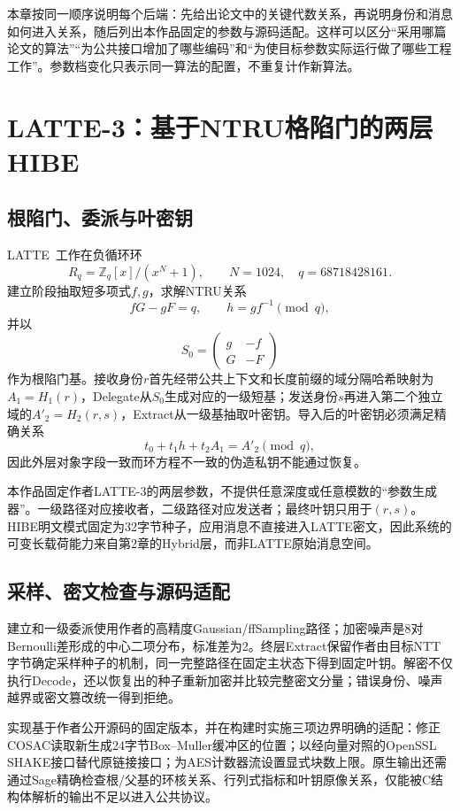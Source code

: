 \documentclass[UTF8,a4paper,12pt,oneside,openany,fontset=fandol]{ctexrep}
\begin{document}
本章按同一顺序说明每个后端：先给出论文中的关键代数关系，再说明身份和消息如何进入关系，随后列出本作品固定的参数与源码适配。这样可以区分“采用哪篇论文的算法”“为公共接口增加了哪些编码”和“为使目标参数实际运行做了哪些工程工作”。参数档变化只表示同一算法的配置，不重复计作新算法。

\section{LATTE-3：基于NTRU格陷门的两层HIBE}
\subsection{根陷门、委派与叶密钥}
LATTE~\cite{zhao2024latte}工作在负循环环
\[
  R_q=\mathbb Z_q[x]/(x^N+1),\qquad N=1024,
  \quad q=68718428161.
\]
建立阶段抽取短多项式$f,g$，求解NTRU关系
\[
  fG-gF=q,
  \qquad h=g f^{-1}\pmod q,
\]
并以
\[
  S_0=\begin{pmatrix}g&-f\\G&-F\end{pmatrix}
\]
作为根陷门基。接收身份$r$首先经带公共上下文和长度前缀的域分隔哈希映射为$A_1=H_1(r)$，Delegate从$S_0$生成对应的一级短基；发送身份$s$再进入第二个独立域的$A'_2=H_2(r,s)$，Extract从一级基抽取叶密钥。导入后的叶密钥必须满足精确关系
\[
  t_0+t_1h+t_2A_1=A'_2\pmod q,
\]
因此外层对象字段一致而环方程不一致的伪造私钥不能通过恢复。

本作品固定作者LATTE-3的两层参数，不提供任意深度或任意模数的“参数生成器”。一级路径对应接收者，二级路径对应发送者；最终叶钥只用于$(r,s)$。HIBE明文模式固定为32字节种子，应用消息不直接进入LATTE密文，因此系统的可变长载荷能力来自第2章的Hybrid层，而非LATTE原始消息空间。

\subsection{采样、密文检查与源码适配}
建立和一级委派使用作者的高精度Gaussian/ffSampling路径；加密噪声是8对Bernoulli差形成的中心二项分布，标准差为2。终层Extract保留作者由目标NTT字节确定采样种子的机制，同一完整路径在固定主状态下得到固定叶钥。解密不仅执行Decode，还以恢复出的种子重新加密并比较完整密文分量；错误身份、噪声越界或密文篡改统一得到拒绝。

实现基于作者公开源码的固定版本，并在构建时实施三项边界明确的适配：修正COSAC读取新生成24字节Box--Muller缓冲区的位置；以经向量对照的OpenSSL SHAKE接口替代原链接接口；为AES计数器流设置显式块数上限。原生输出还需通过Sage精确检查根/父基的环核关系、行列式指标和叶钥原像关系，仅能被C结构体解析的输出不足以进入公共协议。
\end{document}

